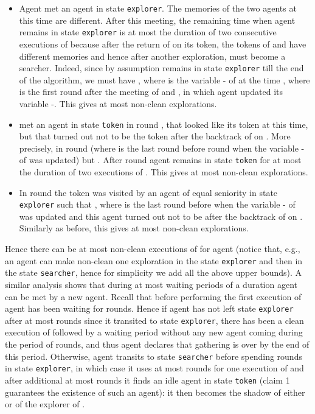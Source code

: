 \documentclass[11pt]{article}
\newcommand{\qed}{\hfill  \bigbreak}
\newenvironment{proof}{\noindent {\bf Proof.}}{\qed}
\begin{document}
\begin{proof}
\begin{itemize}
     \item
     Agent  met an agent  in state {\tt explorer}. The memories of the two agents at this time are different. After this meeting,
   the remaining time when agent  remains in state {\tt explorer} is at most the duration of two consecutive executions of  because after the 
   return of  on its token, the tokens of  and  have different memories and hence after another exploration,  must become a searcher.
   Indeed, since by assumption  remains in state {\tt explorer} till the end of the algorithm, we must have , where  is the variable - of  at the time , where  is the first round after the meeting of  and , in which agent  updated its variable -. 
  This gives at most  non-clean explorations. 
   \item
    met an agent   in state {\tt token} in round , that looked like its token  at this time, but that turned out not to be the token  after the backtrack
    of  on . More precisely,  in round  (where  is the last round {before round } when the variable - of  was updated)
    but . After round  agent  remains in state {\tt token} for at most the duration of two executions of .
    This gives at most  non-clean explorations.
    \item
   {In round  the token  was visited by an agent  of equal seniority in state {\tt explorer} such that , where  is the last round before  when the variable - of  was updated and this agent turned out not to be  after 
    the backtrack of  on . Similarly as before, this gives at most  non-clean explorations.}
     \end{itemize}
     
         
      Hence there can be at most {} non-clean executions of  for agent  
     (notice that, e.g., an agent can make non-clean one exploration in the state 
     {\tt explorer} and then in the state {\tt searcher}, hence for simplicity we add all the above upper bounds). A similar analysis shows that during at most {}
     waiting periods of a duration  agent  can be met by a new agent. Recall that before performing the first  execution of  agent  has been waiting for { rounds}.
     {Hence if agent  has not left state {\tt explorer} after at most  rounds since it transited to state {\tt explorer}, there
     has been a clean execution of  followed by a waiting period without any new agent coming during the period of  rounds, and thus agent  declares that gathering is over by the end of this period. Otherwise, agent  transits to state {\tt searcher} before spending  rounds in state 
  {\tt explorer}, in which case it uses at most  rounds for one execution of  and after
 additional at most   rounds it finds an idle agent  in state {\tt token} (claim 1 guarantees the existence of such an agent): it then becomes 
 the shadow of either  or of the explorer of .}


\end{proof}
\end{document}
